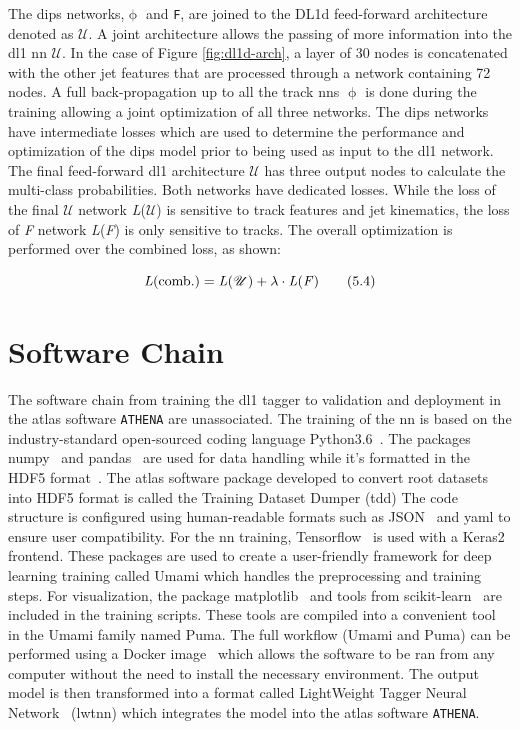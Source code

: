 The \gls{dips} networks,$\upphi$ and \texttt{F}, are joined to the DL1d feed-forward architecture denoted as \textit{$\mathscr{U}$}. A joint architecture allows the passing of more information into the \gls{dl1} 
\gls{nn} \textit{$\mathscr{U}$}. In the case of Figure \ref{fig:dl1d-arch}, a layer of 30 nodes is concatenated with the other jet features that are processed through a network containing 72 nodes. 
A full back-propagation up to all the track \gls{nn}s $\upphi$ is done during the training allowing a joint optimization of all three networks. The \gls{dips} networks have intermediate losses 
which are used to determine the performance and optimization of the \gls{dips} model prior to being used as input to the \gls{dl1} network. The final feed-forward \gls{dl1} architecture \textit{$\mathscr{U}$}
has three output nodes to calculate the multi-class probabilities. Both networks have dedicated losses. While the loss of the final \textit{$\mathscr{U}$} network \textit{L}($\mathscr{U}$) is sensitive 
to track features and jet kinematics, the loss of \textit{F} network \textit{L}(\textit{F}) is only sensitive to tracks. The overall optimization is performed over the combined loss, as shown:

\begin{equation}\label{eq:5.4}
    \textrm{\textit{L}}(\textrm{comb.}) = \textrm{\textit{L}}(\textit{$\mathscr{U}$}) + \lambda \cdot \textrm{\textit{L}}(\textrm{\textit{F}})
\tag{5.4}
\end{equation}


\section{Software Chain}

The software chain from training the \gls{dl1} tagger to validation and deployment in the \gls{atlas} software \texttt{ATHENA} are unassociated. The training of the \gls{nn} 
is based on the industry-standard open-sourced coding language Python3.6~\cite{python}. The packages numpy~\cite{numpy} and pandas~\cite{pandas} are used for data handling
while it's formatted in the HDF5 format~\cite{hdf5}. The \gls{atlas} software package developed to convert root datasets into HDF5 format is called the Training Dataset Dumper (\gls{tdd})
The code structure is configured using human-readable formats such as JSON~\cite{json} and yaml to ensure user compatibility.
For the \gls{nn} training, Tensorflow~\cite{tensorflow} is used with a Keras2~\cite{keras} frontend. These packages are used to create a user-friendly framework for deep learning training 
called Umami which handles the preprocessing and training steps. For visualization, the package matplotlib~\cite{matplotlib}  and tools from 
scikit-learn~\cite{scikit} are included in the training scripts. These tools are compiled into a convenient tool in the Umami family named Puma. The full workflow (Umami and Puma) can be 
performed using a Docker image~\cite{docker} which allows the software to be ran 
from any computer without the need to install the necessary environment. The output model is then transformed into a format called LightWeight Tagger Neural Network~\cite{lwtnn} (\gls{lwtnn})
which integrates the model into the \gls{atlas} software \texttt{ATHENA}.

